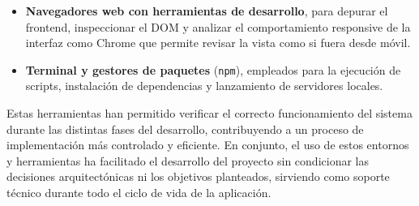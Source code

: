 \begin{itemize}
    \item \textbf{Navegadores web con herramientas de desarrollo}, para depurar el frontend, inspeccionar el DOM y analizar el comportamiento responsive de la interfaz como Chrome que permite revisar la vista como si fuera desde móvil.
    \item \textbf{Terminal y gestores de paquetes} (\texttt{npm}), empleados para la ejecución de scripts, instalación de dependencias y lanzamiento de servidores locales.
\end{itemize}

Estas herramientas han permitido verificar el correcto funcionamiento del sistema durante las distintas fases del desarrollo, contribuyendo a un proceso de implementación más controlado y eficiente.
En conjunto, el uso de estos entornos y herramientas ha facilitado el desarrollo del proyecto sin condicionar las decisiones arquitectónicas ni los objetivos planteados, sirviendo como soporte técnico durante todo el ciclo de vida de la aplicación.

